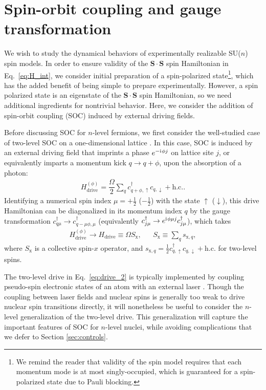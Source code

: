 \documentclass[nofootinbib,twocolumn]{revtex4-2}
\renewcommand{\t}{\text} %
\newcommand{\f}[2]{\dfrac{#1}{#2}} %
\renewcommand{\v}{\bm} %
\renewcommand{\c}{\cdot} %
\renewcommand{\i}{\mathrm{i}\mkern1mu} %
\newcommand{\1}{\mathds{1}}
\newcommand{\up}{\uparrow}
\newcommand{\dn}{\downarrow}
\newcommand{\x}{\text{x}}
\begin{document}
\section{Spin-orbit coupling and gauge transformation}
\label{sec:SOC}

We wish to study the dynamical behaviors of experimentally realizable SU($n$) spin models.
In order to ensure validity of the $\v S\c\v S$ spin Hamiltonian in Eq.~\eqref{eq:H_int}, we consider initial preparation of a spin-polarized state\footnote{We remind the reader that validity of the spin model requires that each momentum mode is at most singly-occupied, which is guaranteed for a spin-polarized state due to Pauli blocking.}, which has the added benefit of being simple to prepare experimentally.
However, a spin polarized state is an eigenstate of the $\v S\c\v S$ spin Hamiltonian, so we need additional ingredients for nontrivial behavior.
Here, we consider the addition of spin-orbit coupling (SOC) induced by external driving fields.

Before discussing SOC for $n$-level fermions, we first consider the well-studied case of two-level SOC on a one-dimensional lattice \cite{wall2016synthetic, bromley2018dynamics}.
In this case, SOC is induced by an external driving field that imprints a phase $e^{-\i\phi j}$ on lattice site $j$, or equivalently imparts a momentum kick $q\to q+\phi$, upon the absorption of a photon:
\begin{align}
  H_{\t{drive}}^{(\phi)}
  = \f{\Omega}{2} \sum_q c_{q+\phi,\up}^\dag c_{q,\dn} + \t{h.c.}.
  \label{eq:drive_2}
\end{align}
Identifying a numerical spin index $\mu=+\frac12$ ($-\frac12$) with the state $\up$ ($\dn$), this drive Hamiltonian can be diagonalized in its momentum index $q$ by the gauge transformation $c_{q\mu}^\dag\to c_{q-\mu\phi,\mu}^\dag$ (equivalently $c_{j\mu}^\dag\to e^{\i\phi\mu j} c_{j\mu}^\dag$), which takes
\begin{align}
  H_{\t{drive}}^{(\phi)} \to H_{\t{drive}} \equiv \Omega S_\x,
  &&
  S_\x \equiv \sum_q s_{\x,q},
  \label{eq:drive_trans}
\end{align}
where $S_\x$ is a collective spin-$x$ operator, and $s_{\x,q}=\frac12 c_{q,\up}^\dag c_{q,\dn} + \t{h.c.}$ for two-level spins.

The two-level drive in Eq.~\eqref{eq:drive_2} is typically implemented by coupling pseudo-spin electronic states of an atom with an external laser \cite{wall2016synthetic, bromley2018dynamics}.
Though the coupling between laser fields and nuclear spins is generally too weak to drive nuclear spin transitions directly, it will nonetheless be useful to consider the $n$-level generalization of the two-level drive.
This generalization will capture the important features of SOC for $n$-level nuclei, while avoiding complications that we defer to Section \ref{sec:controls}.
\end{document}
